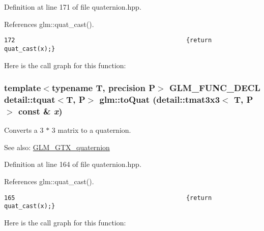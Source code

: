 Definition at line 171 of file quaternion.hpp.

References glm::quat\_\-cast().

\begin{Code}\begin{verbatim}172                                               {return quat_cast(x);}
\end{verbatim}
\end{Code}




Here is the call graph for this function:\hypertarget{group__gtx__quaternion_gdc8d8daae2f8d725dae576d6655e36d2}{
\subsubsection[toQuat]{\setlength{\rightskip}{0pt plus 5cm}template$<$typename T, precision P$>$ GLM\_\-FUNC\_\-DECL detail::tquat$<$T, P$>$ glm::toQuat (detail::tmat3x3$<$ T, P $>$ const \& {\em x})}}
\label{group__gtx__quaternion_gdc8d8daae2f8d725dae576d6655e36d2}


Converts a 3 $\ast$ 3 matrix to a quaternion.

\begin{Desc}
\item[See also:]\hyperlink{group__gtx__quaternion}{GLM\_\-GTX\_\-quaternion} \end{Desc}


Definition at line 164 of file quaternion.hpp.

References glm::quat\_\-cast().

\begin{Code}\begin{verbatim}165                                               {return quat_cast(x);}
\end{verbatim}
\end{Code}




Here is the call graph for this function: